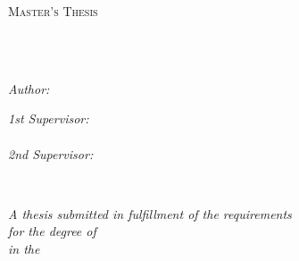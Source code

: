 \documentclass[
11pt, %
oneside, %
english, %
singlespacing, %
headsepline, %
]{thesis} %
\author{Atreya \textsc{Shankar} \\ 799227} %
\theoremstyle{definition}
\theoremstyle{remark}
\begin{document}
\pagestyle{plain} %


\begin{titlepage}
\begin{center}

\vspace*{.06\textheight}
{\scshape\LARGE \univname\par}\vspace{1.5cm} %
\textsc{\Large Master's Thesis}\\[0.5cm] %

\HRule \\[0.4cm] %
{\huge \bfseries \ttitle\par}\vspace{0.4cm} %
\HRule \\[1.5cm] %
 
\begin{minipage}[t]{0.4\textwidth}
\begin{flushleft} \large
\emph{Author:}\\
\href{https://www.linkedin.com/in/atreya-shankar-644352113}{\authorname} %
\end{flushleft}
\end{minipage}
\begin{minipage}[t]{0.4\textwidth}
\begin{flushright} \large
\emph{1st Supervisor:} \\
\href{https://sites.google.com/site/loaicigasharid/portada}{\supname} \\[10pt] %
\emph{2nd Supervisor:} \\
\href{https://www.uzh.ch/cmsssl/cl/de/people/team/compling/mmueller.html}{\examname} %
\end{flushright}
\end{minipage}\\[3cm]
 
\vfill

\large \textit{A thesis submitted in fulfillment of the requirements\\ for the degree of \degreename}\\[0.3cm] %
\textit{in the}\\[0.4cm]
\groupname\\\deptname\\[2cm] %
 

\end{center}
\end{titlepage}
\end{document}

